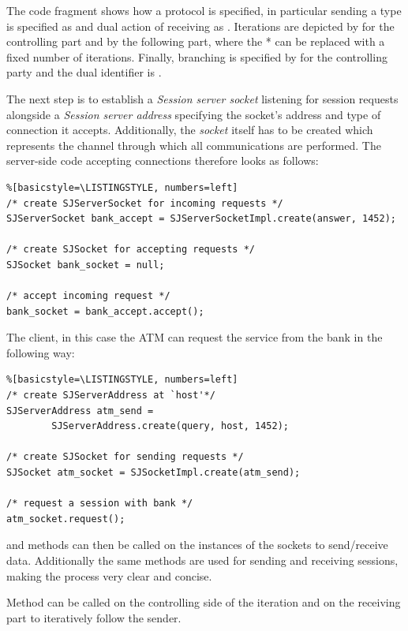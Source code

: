 The code fragment shows how a protocol is specified, in particular sending a type is specified as  and dual action of receiving as . Iterations are depicted by \LST{![...]*} for the controlling part and  by the following part, where the * can be replaced with a fixed number of iterations. Finally, branching is specified by  for the controlling party and the dual identifier is .

The next step is to establish a \textit{Session server socket} listening for session requests alongside a \textit{Session server address} specifying the socket's address and type of connection it accepts. Additionally, the \textit{socket} itself has to be created which represents the channel through which all communications are performed. The server-side code accepting connections therefore looks as follows:

\begin{lstlisting}%[basicstyle=\LISTINGSTYLE, numbers=left]
/* create SJServerSocket for incoming requests */
SJServerSocket bank_accept = SJServerSocketImpl.create(answer, 1452);

/* create SJSocket for accepting requests */
SJSocket bank_socket = null;

/* accept incoming request */
bank_socket = bank_accept.accept();
\end{lstlisting}

The client, in this case the ATM can request the service from the bank in the following way:

\begin{lstlisting}%[basicstyle=\LISTINGSTYLE, numbers=left]
/* create SJServerAddress at `host'*/
SJServerAddress atm_send =
        SJServerAddress.create(query, host, 1452);

/* create SJSocket for sending requests */
SJSocket atm_socket = SJSocketImpl.create(atm_send);

/* request a session with bank */
atm_socket.request();
\end{lstlisting}

 and  methods can then be called on the instances of the sockets to send/receive data. Additionally the same methods are used for sending and receiving sessions, making the process very clear and concise.

Method  can be called on the controlling side of the iteration and  on the receiving part to iteratively follow the sender.

